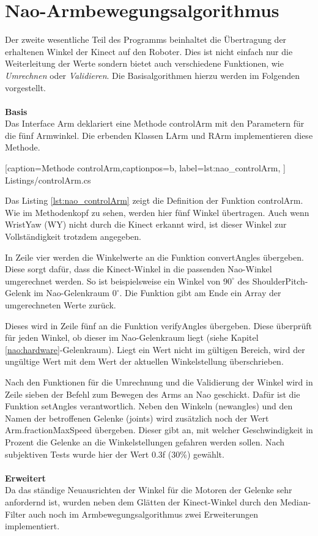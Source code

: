 \section{Nao-Armbewegungsalgorithmus}\label{s:naoAlgo}
Der zweite wesentliche Teil des Programms beinhaltet die Übertragung der erhaltenen Winkel der Kinect auf den Roboter. Dies ist nicht einfach nur die Weiterleitung der Werte sondern bietet auch verschiedene Funktionen, wie \textit{Umrechnen} oder \textit{Validieren}. Die Basisalgorithmen hierzu werden im Folgenden vorgestellt.
\\
\\
\textbf{Basis}
\\
Das Interface \textsf{Arm} deklariert eine Methode \textsf{controlArm} mit den Parametern für die fünf Armwinkel. Die erbenden Klassen \textsf{LArm} und \textsf{RArm} implementieren diese Methode. 


    [caption={Methode \textsf{controlArm}},captionpos=b,
       label=lst:nao_controlArm,
       ]	
 {Listings/controlArm.cs}

Das Listing \ref{lst:nao_controlArm} zeigt die Definition der Funktion \textsf{controlArm}. Wie im Methodenkopf zu sehen, werden hier fünf Winkel übertragen. Auch wenn WristYaw (WY) nicht durch die Kinect erkannt wird, ist dieser Winkel zur Vollständigkeit trotzdem angegeben. 

In Zeile vier werden die Winkelwerte an die Funktion \textsf{convertAngles} übergeben. Diese sorgt dafür, dass die Kinect-Winkel in die passenden Nao-Winkel umgerechnet werden. So ist beispielsweise ein Winkel von $90^\circ$ des ShoulderPitch-Gelenk im Nao-Gelenkraum $0^\circ$. Die Funktion gibt am Ende ein Array der umgerechneten Werte zurück.

Dieses wird in Zeile fünf an die Funktion \textsf{verifyAngles} übergeben. Diese überprüft für jeden Winkel, ob dieser im Nao-Gelenkraum liegt (siehe Kapitel \ref{nao:hardware}-Gelenkraum). Liegt ein Wert nicht im gültigen Bereich, wird der ungültige Wert mit dem Wert der aktuellen Winkelstellung überschrieben.

Nach den Funktionen für die Umrechnung und die Validierung der Winkel wird in Zeile sieben der Befehl zum Bewegen des Arms an Nao geschickt. Dafür ist die Funktion \textsf{setAngles} verantwortlich. Neben den Winkeln (\textsf{newangles}) und den Namen der betroffenen Gelenke (\textsf{joints}) wird zusätzlich noch der Wert \textsf{Arm.fractionMaxSpeed} übergeben. Dieser gibt an, mit welcher Geschwindigkeit in Prozent die Gelenke an die Winkelstellungen gefahren werden sollen. Nach subjektiven Tests wurde hier der Wert 0.3f (30\%) gewählt. 
\\
\\
\textbf{Erweitert}
\\
Da das ständige Neuausrichten der Winkel für die Motoren der Gelenke sehr anfordernd ist, wurden neben dem Glätten der Kinect-Winkel durch den Median-Filter auch noch im Armbewegungsalgorithmus zwei Erweiterungen implementiert.

